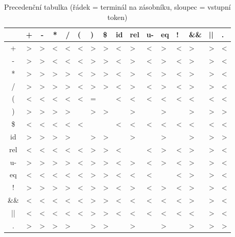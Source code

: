 \begin{table}[H]
  \centering
  \renewcommand{\arraystretch}{1.2}
  \begin{tabular}{c|cccclllllllllll}
           & +& -& *&  /& (& )& \$& id& rel& u-& eq& !& \&\&& ||&.\\ \hline
    +& >& >& <&  <& <& >& >& <& >& <& >& <& >& >&<\\
    -& >& >& <&  <& <& >& >& <& >& <& >& <& >& >&<\\
    *& >& >& >&  >& <& >& >& <& >& <& >& <& >& >&<\\
    /& >& >& >&  >&   <& >& >& <& >& <& >& <& >& >&<\\
 (& <& <& <& <&  <& =& & <& <& <& <& <& <& <&<\\
 )& >& >& >& >& & >& >& & >& & >& & >& >&>\\
 \$& <& <& <& <& <& & & <& <& <& <& <& <& <&<\\
 id& >& >& >& >& & >& >& & >& & >& & >& >&>\\
 rel& <& <& <& <& <& >& >& <& & <& >& <& >& >&<\\
 u-& >& >& >& >& <& >& >& <& >& <& >& <& >& >&<\\
 eq& <& <& <& <& <& >& >& <& <& <& & <& >& >&<\\
 !& >& >& >& >& <& >& >& <& >& <& >& <& >& >&<\\
 \&\&& <& <& <& <& <& >& >& <& <& <& <& <& >& >&<\\
 ||& <& <& <& <& <& >& >& <& <& <& <& <& <& >&<\\
 .& >& >& >& >& & >& >& & >& & >& & >& >&>\\
  \end{tabular}
  \caption{Precedenční tabulka (řádek = terminál na zásobníku,
           sloupec = vstupní token)}
  \label{tab:precedence}
\end{table}
